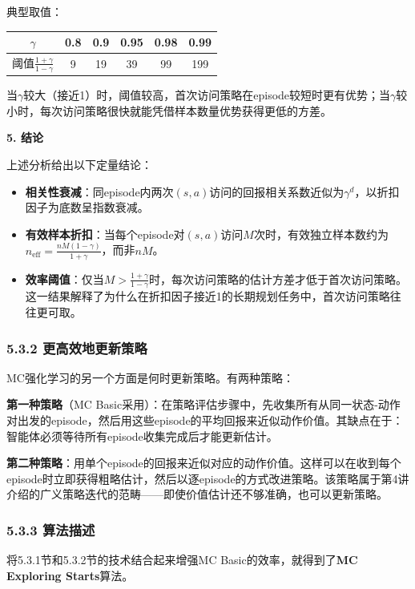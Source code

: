 \documentclass[UTF8]{article}
\begin{document}
\begin{remarkbox}
典型取值：
\begin{center}
\begin{tabular}{c|ccccc}
\hline
$\gamma$ & 0.8 & 0.9 & 0.95 & 0.98 & 0.99 \\
\hline
阈值$\frac{1+\gamma}{1-\gamma}$ & 9 & 19 & 39 & 99 & 199 \\
\hline
\end{tabular}
\end{center}
当$\gamma$较大（接近1）时，阈值较高，首次访问策略在episode较短时更有优势；当$\gamma$较小时，每次访问策略很快就能凭借样本数量优势获得更低的方差。

\smallskip
\noindent\textbf{5. 结论}

上述分析给出以下定量结论：
\begin{itemize}
    \item \textbf{相关性衰减}：同episode内两次$(s,a)$访问的回报相关系数近似为$\gamma^d$，以折扣因子为底数呈指数衰减。
    \item \textbf{有效样本折扣}：当每个episode对$(s,a)$访问$M$次时，有效独立样本数约为$n_{\text{eff}} = \frac{nM(1-\gamma)}{1+\gamma}$，而非$nM$。
    \item \textbf{效率阈值}：仅当$M > \frac{1+\gamma}{1-\gamma}$时，每次访问策略的估计方差才低于首次访问策略。这一结果解释了为什么在折扣因子接近1的长期规划任务中，首次访问策略往往更可取。
\end{itemize}
\end{remarkbox}

\subsubsection*{5.3.2 更高效地更新策略}

MC强化学习的另一个方面是何时更新策略。有两种策略：

\textbf{第一种策略}（MC Basic采用）：在策略评估步骤中，先收集所有从同一状态-动作对出发的episode，然后用这些episode的平均回报来近似动作价值。其缺点在于：智能体必须等待所有episode收集完成后才能更新估计。

\textbf{第二种策略}：用单个episode的回报来近似对应的动作价值。这样可以在收到每个episode时立即获得粗略估计，然后以逐episode的方式改进策略。该策略属于第4讲介绍的广义策略迭代的范畴——即使价值估计还不够准确，也可以更新策略。

\subsubsection*{5.3.3 算法描述}

将5.3.1节和5.3.2节的技术结合起来增强MC Basic的效率，就得到了\textbf{MC Exploring Starts}算法。
\end{document}
